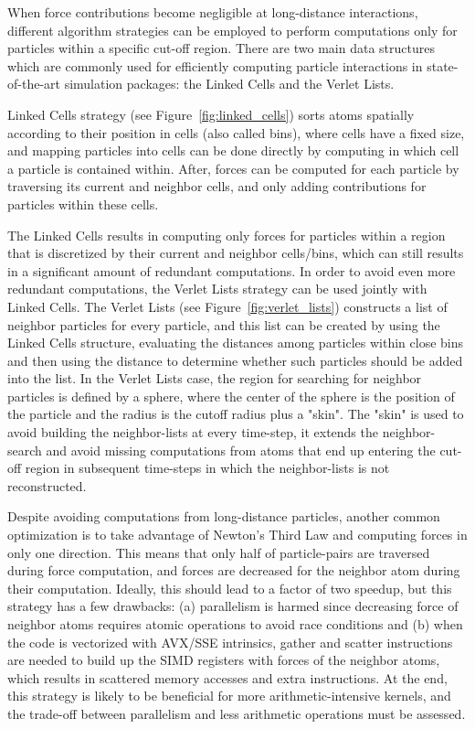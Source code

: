 \documentclass[preprint,12pt]{elsarticle}
\begin{document}
When force contributions become negligible at long-distance interactions, different algorithm strategies can be employed to perform computations only for particles within a specific cut-off region.
There are two main data structures which are commonly used for efficiently computing particle interactions in state-of-the-art simulation packages: the Linked Cells and the Verlet Lists.

Linked Cells strategy (see Figure~\ref{fig:linked_cells}) sorts atoms spatially according to their position in cells (also called bins), where cells have a fixed size, and mapping particles into cells can be done directly by computing in which cell a particle is contained within.
After, forces can be computed for each particle by traversing its current and neighbor cells, and only adding contributions for particles within these cells.

The Linked Cells results in computing only forces for particles within a region that is discretized by their current and neighbor cells/bins, which can still results in a significant amount of redundant computations.
In order to avoid even more redundant computations, the Verlet Lists strategy can be used jointly with Linked Cells.
The Verlet Lists (see Figure~\ref{fig:verlet_lists}) constructs a list of neighbor particles for every particle, and this list can be created by using the Linked Cells structure, evaluating the distances among particles within close bins and then using the distance to determine whether such particles should be added into the list.
In the Verlet Lists case, the region for searching for neighbor particles is defined by a sphere, where the center of the sphere is the position of the particle and the radius is the cutoff radius plus a "skin".
The "skin" is used to avoid building the neighbor-lists at every time-step, it extends the neighbor-search and avoid missing computations from atoms that end up entering the cut-off region in subsequent time-steps in which the neighbor-lists is not reconstructed.

Despite avoiding computations from long-distance particles, another common optimization is to take advantage of Newton's Third Law and computing forces in only one direction.
This means that only half of particle-pairs are traversed during force computation, and forces are decreased for the neighbor atom during their computation.
Ideally, this should lead to a factor of two speedup, but this strategy has a few drawbacks: (a) parallelism is harmed since decreasing force of neighbor atoms requires atomic operations to avoid race conditions and (b) when the code is vectorized with AVX/SSE intrinsics, gather and scatter instructions are needed to build up the SIMD registers with forces of the neighbor atoms, which results in scattered memory accesses and extra instructions.
At the end, this strategy is likely to be beneficial for more arithmetic-intensive kernels, and the trade-off between parallelism and less arithmetic operations must be assessed.
\end{document}
